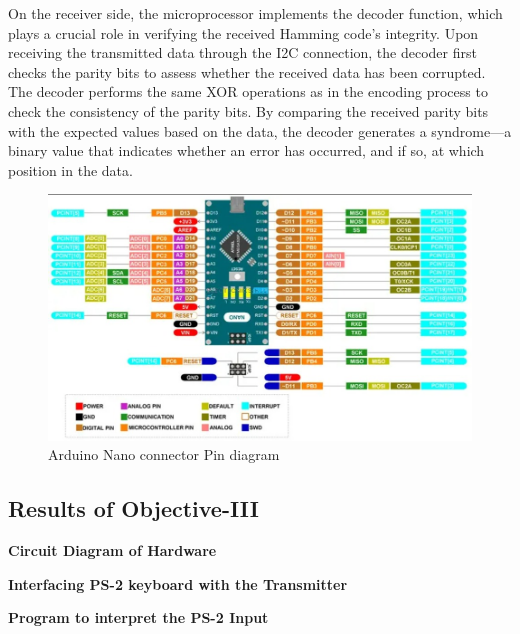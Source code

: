 \documentclass{article}
\numberwithin{equation}{section}
\numberwithin{figure}{section}
\numberwithin{table}{section}
\begin{document}
On the receiver side, the microprocessor implements the decoder function, which plays a crucial role in verifying the received Hamming code’s integrity. Upon receiving the transmitted data through the I2C connection, the decoder first checks the parity bits to assess whether the received data has been corrupted. The decoder performs the same XOR operations as in the encoding process to check the consistency of the parity bits. By comparing the received parity bits with the expected values based on the data, the decoder generates a syndrome—a binary value that indicates whether an error has occurred, and if so, at which position in the data.

    
\begin{figure}[htbp]
    \includegraphics[scale=0.5]{WhatsApp Image 2024-12-02 at 1.06.30 PM.jpeg}
    \centering
    \caption{Arduino Nano connector Pin diagram}
    \label{fig:fig6}
\end{figure}




\pagebreak
\subsection{Results of Objective-III}
\textbf{Circuit Diagram of Hardware}



% 
% 

\textbf{Interfacing PS-2 keyboard with the Transmitter}

\textbf{Program to interpret the PS-2 Input}


\pagebreak
\end{document}

